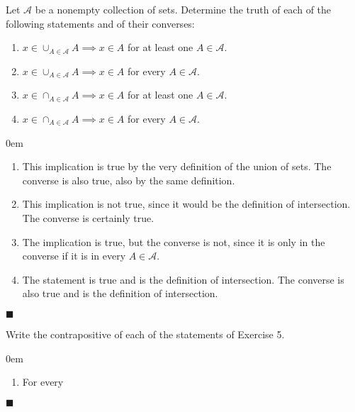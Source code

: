 \documentclass[12pt]{article}
\renewcommand{\qed}{\hfill$\blacksquare$}
\renewenvironment{proof}{\begin{addmargin}[1em]{0em}\begin{newproof}}{\end{newproof}\end{addmargin}\qed}
\newenvironment{problem}[2][Exercise]{\begin{trivlist}
\item[\hskip \labelsep {\bfseries #1}\hskip \labelsep {\bfseries #2.}]}{\end{trivlist}}
\begin{document}
\begin{problem}{1.1.5}
Let $\mathcal{A}$ be a nonempty collection of sets. Determine the truth of each of the following statements and of their converses:
\begin{enumerate}[label=(\alph*)]
	\item $x\in \cup_{A\in \mathcal{A}} A \implies x\in A$ for at least one $A\in \mathcal{A}$.
	\item $x \in \cup_{A\in \mathcal{A}} A \implies x\in A$ for every $A \in \mathcal{A}$.
	\item $x \in \cap_{A\in \mathcal{A}} A \implies x\in A$ for at least one $A \in \mathcal{A}$.
	\item $x \in \cap_{A\in \mathcal{A}} A \implies x \in A$ for every $A \in \mathcal{A}$.
\end{enumerate}
\end{problem}
\begin{proof}
\begin{enumerate}[label=(\alph*)]
	\item This implication is true by the very definition of the union of sets. The converse is also true, also by the same definition.
	\item This implication is not true, since it would be the definition of intersection. The converse is certainly true.
	\item The implication is true, but the converse is not, since it is only in the converse if it is in every $A\in \mathcal{A}$.
	\item The statement is true and is the definition of intersection. The converse is also true and is the definition of intersection.
\end{enumerate}
\end{proof}


\begin{problem}{1.1.6}
Write the contrapositive of each of the statements of Exercise 5.
\end{problem}
\begin{proof}
\begin{enumerate}[label=(\alph*)]
	\item For every
\end{enumerate}
\end{proof}
\end{document}
